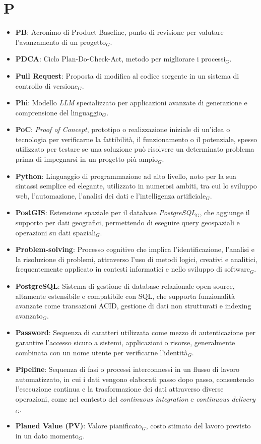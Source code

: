 \section{P}
\begin{itemize}
    \item \textbf{PB}: Acronimo di Product Baseline, punto di revisione per valutare l'avanzamento di un progetto$_G$.
    \item \textbf{PDCA}: Ciclo Plan-Do-Check-Act, metodo per migliorare i processi$_G$.
    \item \textbf{Pull Request}: Proposta di modifica al codice sorgente in un sistema di controllo di versione$_G$.
    \item \textbf{Phi}: Modello \textit{LLM} specializzato per applicazioni avanzate di generazione e comprensione del linguaggio$_G$.
    \item \textbf{PoC}: \textit{Proof of Concept}, prototipo o realizzazione iniziale di un'idea o tecnologia per verificarne la fattibilità, il funzionamento o il potenziale, spesso utilizzato per testare se una soluzione può risolvere un determinato problema prima di impegnarsi in un progetto più ampio$_G$.
    \item \textbf{Python}: Linguaggio di programmazione ad alto livello, noto per la sua sintassi semplice ed elegante, utilizzato in numerosi ambiti, tra cui lo sviluppo web, l'automazione, l'analisi dei dati e l'intelligenza artificiale$_G$.
    \item \textbf{PostGIS}: Estensione spaziale per il database \textit{PostgreSQL}$_G$, che aggiunge il supporto per dati geografici, permettendo di eseguire query geospaziali e operazioni su dati spaziali$_G$.
    \item \textbf{Problem-solving}: Processo cognitivo che implica l'identificazione, l'analisi e la risoluzione di problemi, attraverso l'uso di metodi logici, creativi e analitici, frequentemente applicato in contesti informatici e nello sviluppo di software$_G$.
    \item \textbf{PostgreSQL}: Sistema di gestione di database relazionale open-source, altamente estensibile e compatibile con SQL, che supporta funzionalità avanzate come transazioni ACID, gestione di dati non strutturati e indexing avanzato$_G$.
    \item \textbf{Password}: Sequenza di caratteri utilizzata come mezzo di autenticazione per garantire l'accesso sicuro a sistemi, applicazioni o risorse, generalmente combinata con un nome utente per verificarne l'identità$_G$.
    \item \textbf{Pipeline}: Sequenza di fasi o processi interconnessi in un flusso di lavoro automatizzato, in cui i dati vengono elaborati passo dopo passo, consentendo l'esecuzione continua e la trasformazione dei dati attraverso diverse operazioni, come nel contesto del \textit{continuous integration} e \textit{continuous delivery}$_G$.
    \item \textbf{Planed Value (PV)}: Valore pianificato$_G$, costo stimato del lavoro previsto in un dato momento$_G$.
\end{itemize}
